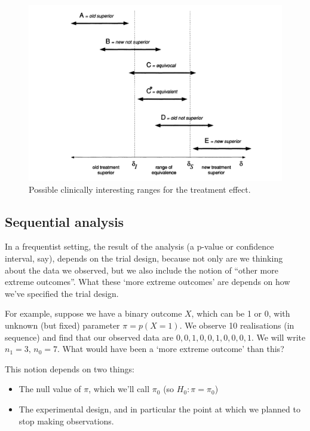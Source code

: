 \documentclass[
  openany]{book}
\providecommand{\tightlist}{%
  \setlength{\itemsep}{0pt}\setlength{\parskip}{0pt}}
\theoremstyle{definition}
\theoremstyle{definition}
\theoremstyle{definition}
\theoremstyle{definition}
\theoremstyle{remark}
\begin{document}
\begin{figure}
\centering
\includegraphics{images/bayesian_ranges.png}
\caption{\label{fig:spieg-ranges}Possible clinically interesting ranges for the treatment effect.}
\end{figure}

\hypertarget{sequential-analysis}{%
\subsection*{Sequential analysis}\label{sequential-analysis}}

In a frequentist setting, the result of the analysis (a p-value or confidence interval, say), depends on the trial design, because not only are we thinking about the data we observed, but we also include the notion of ``other more extreme outcomes''. What these `more extreme outcomes' are depends on how we've specified the trial design.

For example, suppose we have a binary outcome \(X\), which can be 1 or 0, with unknown (but fixed) parameter \(\pi = p\left(X=1\right)\). We observe 10 realisations (in sequence) and find that our observed data are \(0, 0, 1, 0, 0, 1, 0, 0, 0, 1\). We will write \(n_1=3,\,n_0=7\). What would have been a `more extreme outcome' than this?

This notion depends on two things:

\begin{itemize}
\tightlist
\item
  The null value of \(\pi\), which we'll call \(\pi_0\) (so \(H_0: \pi=\pi_0\))
\item
  The experimental design, and in particular the point at which we planned to stop making observations.
\end{itemize}
\end{document}
